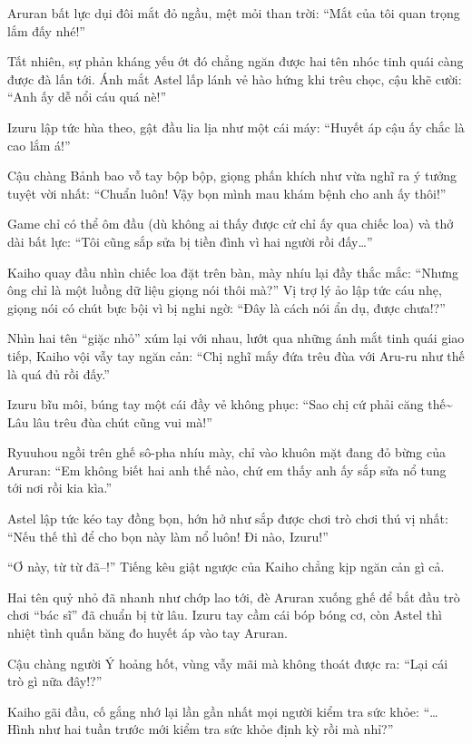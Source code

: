 \documentclass[../main.tex]{subfiles}
\begin{document}
Aruran bất lực dụi đôi mắt đỏ ngầu, mệt mỏi than trời: ``Mắt của tôi quan trọng lắm đấy nhé!''

Tất nhiên, sự phản kháng yếu ớt đó chẳng ngăn được hai tên nhóc tinh quái càng được đà lấn tới. Ánh mắt Astel lấp lánh vẻ hào hứng khi trêu chọc, cậu khẽ cười: ``Anh ấy dễ nổi cáu quá nè!''

Izuru lập tức hùa theo, gật đầu lia lịa như một cái máy: ``Huyết áp cậu ấy chắc là cao lắm á!''

Cậu chàng Bảnh bao vỗ tay bộp bộp, giọng phấn khích như vừa nghĩ ra ý tưởng tuyệt vời nhất: ``Chuẩn luôn! Vậy bọn mình mau khám bệnh cho anh ấy thôi!''

Game chỉ có thể ôm đầu (dù không ai thấy được cử chỉ ấy qua chiếc loa) và thở dài bất lực: ``Tôi cũng sắp sửa bị tiền đình vì hai người rồi đấy\dots''

Kaiho quay đầu nhìn chiếc loa đặt trên bàn, mày nhíu lại đầy thắc mắc: ``Nhưng ông chỉ là một luồng dữ liệu giọng nói thôi mà?'' Vị trợ lý ảo lập tức cáu nhẹ, giọng nói có chút bực bội vì bị nghi ngờ: ``Đây là cách nói ẩn dụ, được chưa!?''

Nhìn hai tên ``giặc nhỏ'' xúm lại với nhau, lướt qua những ánh mắt tinh quái giao tiếp, Kaiho vội vẫy tay ngăn cản: ``Chị nghĩ mấy đứa trêu đùa với Aru-ru như thế là quá đủ rồi đấy.''

Izuru bĩu môi, búng tay một cái đầy vẻ không phục: ``Sao chị cứ phải căng thế\~{} Lâu lâu trêu đùa chút cũng vui mà!''

Ryuuhou ngồi trên ghế sô-pha nhíu mày, chỉ vào khuôn mặt đang đỏ bừng của Aruran: ``Em không biết hai anh thế nào, chứ em thấy anh ấy sắp sửa nổ tung tới nơi rồi kia kìa.''

Astel lập tức kéo tay đồng bọn, hớn hở như sắp được chơi trò chơi thú vị nhất: ``Nếu thế thì để cho bọn này làm nổ luôn! Đi nào, Izuru!''

``Ơ này, từ từ đã--!'' Tiếng kêu giật ngược của Kaiho chẳng kịp ngăn cản gì cả.

Hai tên quỷ nhỏ đã nhanh như chớp lao tới, đè Aruran xuống ghế để bắt đầu trò chơi ``bác sĩ'' đã chuẩn bị từ lâu. Izuru tay cầm cái bóp bóng cơ, còn Astel thì nhiệt tình quấn băng đo huyết áp vào tay Aruran.

Cậu chàng người Ý hoảng hốt, vùng vẫy mãi mà không thoát được ra: ``Lại cái trò gì nữa đây!?''


Kaiho gãi đầu, cố gắng nhớ lại lần gần nhất mọi người kiểm tra sức khỏe: ``\dots Hình như hai tuần trước mới kiểm tra sức khỏe định kỳ rồi mà nhỉ?''
\end{document}

